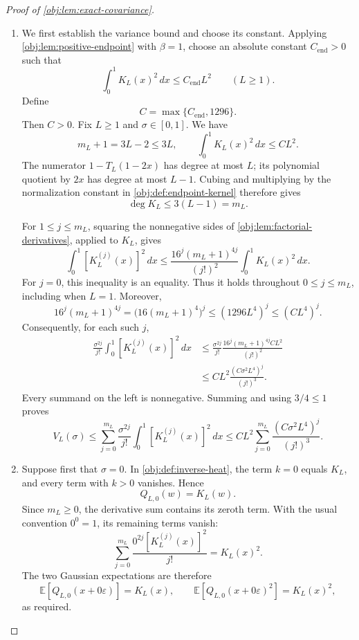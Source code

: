 \begin{proof}[Proof of \cref{obj:lem:exact-covariance}]
\begin{enumerate}
\item We first establish the variance bound and choose its constant. Applying \cref{obj:lem:positive-endpoint} with \(\beta=1\), choose an absolute constant \(C_{\mathrm{end}}>0\) such that
\[
\int_0^1 K_L(x)^2\,dx\le C_{\mathrm{end}}L^2
\qquad(L\ge1).
\]
Define
\[
C=\max\{C_{\mathrm{end}},1296\}.
\]
Then \(C>0\). Fix \(L\ge1\) and \(\sigma\in[0,1]\). We have
\[
m_L+1=3L-2\le3L,
\qquad
\int_0^1 K_L(x)^2\,dx\le CL^2.
\]
The numerator \(1-T_L(1-2x)\) has degree at most \(L\); its polynomial quotient by \(2x\) has degree at most \(L-1\). Cubing and multiplying by the normalization constant in \cref{obj:def:endpoint-kernel} therefore gives
\[
\deg K_L\le3(L-1)=m_L.
\]

For \(1\le j\le m_L\), squaring the nonnegative sides of \cref{obj:lem:factorial-derivatives}, applied to \(K_L\), gives
\[
\int_0^1 [K_L^{(j)}(x)]^2\,dx
\le
\frac{16^j(m_L+1)^{4j}}{(j!)^2}
\int_0^1 K_L(x)^2\,dx.
\]
For \(j=0\), this inequality is an equality. Thus it holds throughout \(0\le j\le m_L\), including when \(L=1\). Moreover,
\[
16^j(m_L+1)^{4j}
=\bigl(16(m_L+1)^4\bigr)^j
\le(1296L^4)^j
\le(CL^4)^j.
\]
Consequently, for each such \(j\),
\[
\begin{aligned}
\frac{\sigma^{2j}}{j!}
\int_0^1 [K_L^{(j)}(x)]^2\,dx
&\le
\frac{\sigma^{2j}}{j!}
\frac{16^j(m_L+1)^{4j}CL^2}{(j!)^2}\\
&\le
CL^2\frac{(C\sigma^2L^4)^j}{(j!)^3}.
\end{aligned}
\]
Every summand on the left is nonnegative. Summing and using \(3/4\le1\) proves
\[
V_L(\sigma)
\le
\sum_{j=0}^{m_L}\frac{\sigma^{2j}}{j!}
\int_0^1 [K_L^{(j)}(x)]^2\,dx
\le
CL^2\sum_{j=0}^{m_L}
\frac{(C\sigma^2L^4)^j}{(j!)^3}.
\]

\item Suppose first that \(\sigma=0\). In \cref{obj:def:inverse-heat}, the term \(k=0\) equals \(K_L\), and every term with \(k>0\) vanishes. Hence
\[
Q_{L,0}(w)=K_L(w).
\]
Since \(m_L\ge0\), the derivative sum contains its zeroth term. With the usual convention \(0^0=1\), its remaining terms vanish:
\[
\sum_{j=0}^{m_L}\frac{0^{2j}[K_L^{(j)}(x)]^2}{j!}
=K_L(x)^2.
\]
The two Gaussian expectations are therefore
\[
\mathbb E[Q_{L,0}(x+0\varepsilon)]=K_L(x),
\qquad
\mathbb E[Q_{L,0}(x+0\varepsilon)^2]=K_L(x)^2,
\]
as required.


\end{enumerate}
\end{proof}

